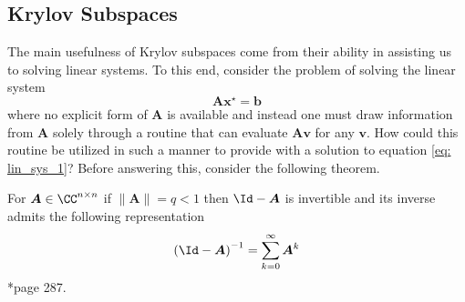 
\subsection{Krylov Subspaces}\label{Section4.1}

The main usefulness of Krylov subspaces come from their ability in assisting us to solving linear systems. To this end, consider the problem of solving the linear system
\begin{equation}\label{eq: lin_sys_1}
    \bm{A} \bm{x^{\star}} = \bm{b}
\end{equation}
where no explicit form of $\bm{A}$ is available and instead one must draw information from $\bm{A}$ solely through a routine that can evaluate $\bm{A} \bm{v}$ for any $\bm{v}$. How could this routine be utilized in such a manner to provide with a solution to equation \ref{eq: lin_sys_1}? Before answering this, consider the following theorem.

\begin{thm} \label{theorem: invert_mat_norm}
    For $\bm{A} \in \CC^{n \times n}$ if $\| \bm{A} \| = q < 1$ then $\Id - \bm{A}$ is invertible and its inverse admits the following representation
    \begin{equation*} \label{eq: convg-of-part}
        \left( \Id - \bm{A} \right)^{-1} = \sum_{k=0}^{\infty} \bm{A}^k
    \end{equation*}
    \cite{BerezanskyMakarovich1996FaV1}*{page 287}.
\end{thm}

